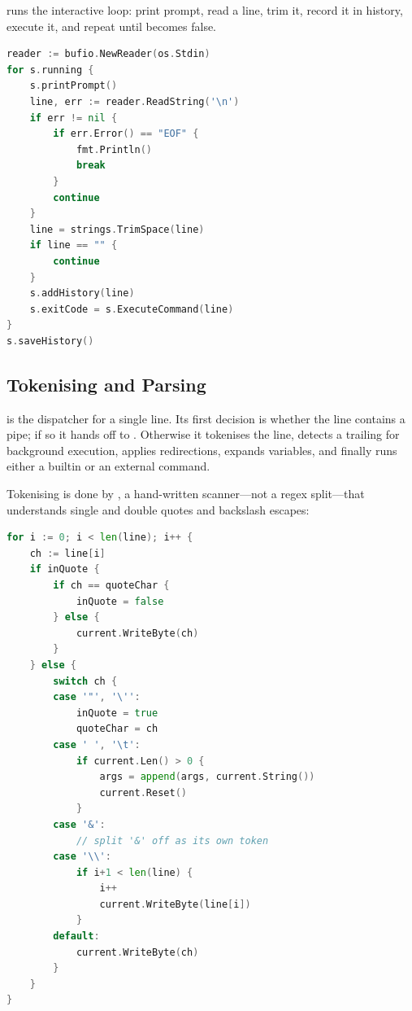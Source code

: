  runs the interactive loop: print prompt, read a line, trim it,
record it in history, execute it, and repeat until  becomes false.

\begin{lstlisting}[language=Go, caption={The main REPL loop (shell/shell.go)}]
reader := bufio.NewReader(os.Stdin)
for s.running {
    s.printPrompt()
    line, err := reader.ReadString('\n')
    if err != nil {
        if err.Error() == "EOF" {
            fmt.Println()
            break
        }
        continue
    }
    line = strings.TrimSpace(line)
    if line == "" {
        continue
    }
    s.addHistory(line)
    s.exitCode = s.ExecuteCommand(line)
}
s.saveHistory()
\end{lstlisting}

\subsection{Tokenising and Parsing}

 is the dispatcher for a single line. Its first decision is
whether the line contains a pipe; if so it hands off to .
Otherwise it tokenises the line, detects a trailing \code{\&} for background
execution, applies redirections, expands variables, and finally runs either a
builtin or an external command.

Tokenising is done by , a hand-written scanner---not a regex
split---that understands single and double quotes and backslash escapes:

\begin{lstlisting}[language=Go, caption={Quote- and escape-aware tokeniser (shell/shell.go)}]
for i := 0; i < len(line); i++ {
    ch := line[i]
    if inQuote {
        if ch == quoteChar {
            inQuote = false
        } else {
            current.WriteByte(ch)
        }
    } else {
        switch ch {
        case '"', '\'':
            inQuote = true
            quoteChar = ch
        case ' ', '\t':
            if current.Len() > 0 {
                args = append(args, current.String())
                current.Reset()
            }
        case '&':
            // split '&' off as its own token
        case '\\':
            if i+1 < len(line) {
                i++
                current.WriteByte(line[i])
            }
        default:
            current.WriteByte(ch)
        }
    }
}
\end{lstlisting}

